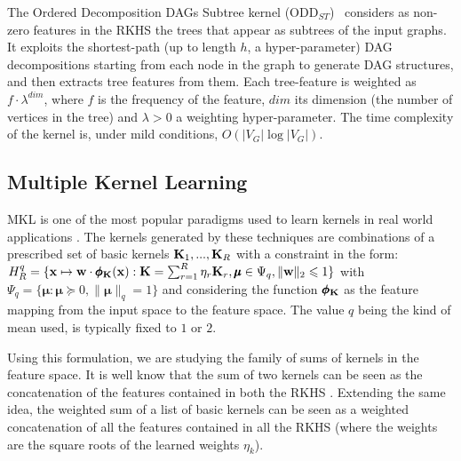 \documentclass{esannV2}
\newcommand{\xx}{{\bf x}}
\newcommand{\KK}{{\bf K}}
\newcommand{\1}{{\bf 1}}
\newcommand{\mmu}{\pmb{\mu}}
\newcommand{\pphi}{\pmb{\phi}}
\begin{document}
The Ordered Decomposition DAGs Subtree kernel (ODD$_{ST}$)~\cite{Dasan2012,DaSanMartino2016} considers as non-zero features in the RKHS the trees that appear as subtrees of the input graphs.
It exploits the shortest-path (up to length $h$, a hyper-parameter) DAG decompositions starting from each node in the graph to generate DAG structures, and then extracts tree features from them.
Each tree-feature is weighted as $f \cdot \lambda^{dim}$, where $f$ is the frequency of the feature, $dim$ its dimension (the number of vertices in the tree) and $\lambda>0$ a weighting hyper-parameter.
The time complexity of the kernel is, under mild conditions, $O(|V_G| \log |V_G|)$.%

\subsection{Multiple Kernel Learning}
\label{MKL}
MKL \cite{Gonen2011} is one of the most popular paradigms used to learn kernels in real world applications \cite{Bucak2014,Castro2014}. %
The kernels generated by these techniques are combinations of a prescribed set of basic kernels $\KK_1,...,\KK_R$ with a constraint in the form:
$
	H_R^q = \{ \xx \mapsto \textbf{w} \cdot \pphi_\KK(\xx) : \KK = \sum_{r=1}^R \eta_r \KK_r, \mmu \in \Psi_q, \|\textbf{w}\|_2 \leqslant 1 \}
$
with $\Psi_q = \{ \mmu : \mmu \succcurlyeq 0, \| \mmu \|_q = 1 \}$ and considering the function $\pphi_\KK$ as the feature mapping from the input space to the feature space. The value $q$ being the kind of mean used, is typically fixed to $1$ or $2$.

Using this formulation, we are studying the family of sums of kernels in the feature space. It is well know that the sum of two kernels can be seen as the concatenation of the features contained in both the RKHS \cite{Shawe-Taylor2004}. Extending the same idea, the weighted sum of a list of basic kernels can be seen as a weighted concatenation of all the features contained in all the RKHS (where the weights are the square roots of the learned weights $\eta_k$).

\end{document}
